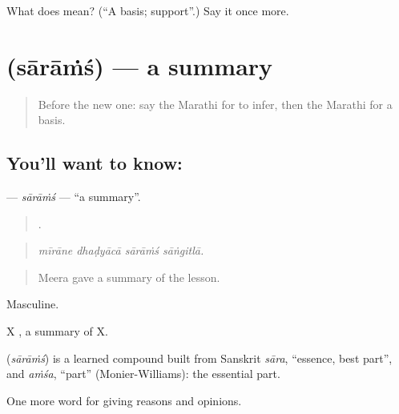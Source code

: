 \begin{tcolorbox}[breakable,colback=teal!4,colframe=teal!35!black,title={Before you move on}]
What does  mean? (\textquotedblleft{}A basis; support\textquotedblright{}.) Say it once more.
\end{tcolorbox}
\section[\texorpdfstring{\mr{सारांश} (sārāṁś)}{सारांश (sārāṁś)}]{ (sārāṁś) — a summary}

\label{lesson:MR-C345-sarams}



\begin{quote}
Before the new one: say the Marathi for to infer, then the Marathi for a basis.
\end{quote}

\subsection*{You'll want to know: }
\textbf{} — \emph{sārāṁś} — \textquotedblleft{}a summary\textquotedblright{}.

\begin{quote}
   .
\end{quote}

\begin{quote}
\emph{mīrāne dhaḍyācā sārāṁś sāṅgitlā.}
\end{quote}

\begin{quote}
Meera gave a summary of the lesson.
\end{quote}

Masculine.

X  , a summary of X.

\begin{cousinweb}
\textbf{} (\emph{sārāṁś}) is a learned compound built from Sanskrit \emph{sāra}, \textquotedblleft{}essence, best part\textquotedblright{}, and \emph{aṁśa}, \textquotedblleft{}part\textquotedblright{} (Monier-Williams): the essential part.
\end{cousinweb}

\begin{grammarlens}[title={What you've built}]
One more word for giving reasons and opinions.
\end{grammarlens}

